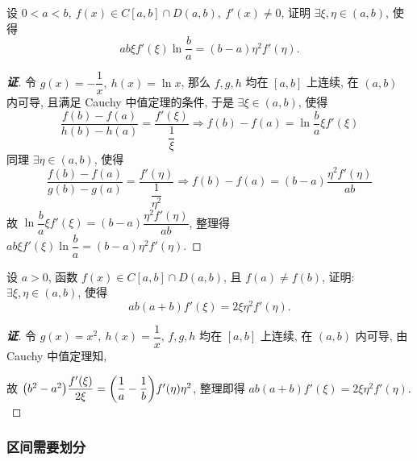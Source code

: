 \begin{example}
    设 $0<a<b,~f(x)\in C[a,b]\cap D(a,b),~f'(x)\neq0$, 证明 $\exists\xi,\eta\in(a,b)$, 使得 $$ab\xi f'(\xi)\ln\dfrac{b}{a}=(b-a)\eta^2f'(\eta).$$
\end{example}
\begin{proof}[{\songti \textbf{证}}]
    令 $g(x)=-\dfrac{1}{x},~h(x)=\ln x$, 那么 $f,g,h$ 均在 $[a,b]$ 上连续, 在 $(a,b)$ 内可导, 且满足 Cauchy 中值定理的条件, 于是
    $\exists\xi\in(a,b)\text{, 使得 }$
    $$\dfrac{f(b)-f(a)}{h(b)-h(a)}=\dfrac{f'(\xi)}{\dfrac{1}{\xi}}\Rightarrow f(b)-f(a)=\ln\dfrac{b}{a}\xi f'(\xi)$$
    同理
    $\exists\eta\in(a,b)\text{, 使得 }$
    $$\dfrac{f(b)-f(a)}{g(b)-g(a)}=\dfrac{f'(\eta)}{\dfrac{1}{\eta^2}}\Rightarrow f(b)-f(a)=(b-a)\dfrac{\eta^2f'(\eta)}{ab}$$
    故 $\ln\dfrac{b}{a}\xi f'(\xi)=(b-a)\dfrac{\eta^2f'(\eta)}{ab}$, 整理得 $ab\xi f'(\xi)\ln\dfrac{b}{a}=(b-a)\eta^2f'(\eta).$
\end{proof}

\begin{example}
    设 $a>0$, 函数 $f(x)\in C[a,b]\cap D(a,b)$, 且 $f(a)\neq f(b)$, 证明: $\exists \xi,\eta\in(a,b)$, 使得 $$ab(a+b)f'(\xi)=2\xi\eta^2f'(\eta).$$
\end{example}
\begin{proof}[{\songti \textbf{证}}]
    令 $g(x)=x^2,~h(x)=\dfrac{1}{x}$, $f,g,h$ 均在 $[a,b]$ 上连续, 在 $(a,b)$ 内可导, 由 Cauchy 中值定理知, 
    故 $\qty(b^2-a^2)\dfrac{f'(\xi)}{2\xi}=\qty(\dfrac{1}{a}-\dfrac{1}{b})f'(\eta)\eta^2$, 整理即得 $ab(a+b)f'(\xi)=2\xi\eta^2f'(\eta).$
\end{proof}

\subsubsection{区间需要划分}

